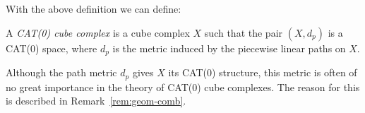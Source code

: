 With the above definition we can define:

\begin{defin}
  A \emph{CAT(0) cube complex} is a cube complex \(X\) such that the pair \((X,d_p)\) is a CAT(0) space, where \(d_p\) is the metric induced by the piecewise linear paths on \(X\).
\end{defin}

\begin{rem}
  Although the path metric \(d_p\) gives \(X\) its CAT(0) structure, this metric is often of no great importance in the theory of CAT(0) cube complexes. The reason for this is described in Remark~\ref{rem:geom-comb}.
\end{rem}



